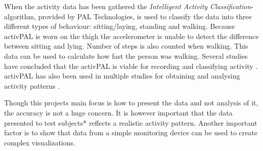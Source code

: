 When the activity data has been gathered the \emph{Intelligent Activity Classification}-algorithm, provided by PAL Technologies, is used to classify the data into three different types of behaviour: sitting/laying, standing and walking. Because activPAL is worn on the thigh the accelerometer is unable to detect the difference between sitting and lying. Number of steps is also counted when walking. This data can be used to calculate how fast the person was walking.
Several studies have concluded that the activPAL is viable for recording and classifying activity \cite{grant2006, ryan2006, grant2008, tsavourelou}.
activPAL has also been used in multiple studies for obtaining and analysing activity patterns \cite{grant2010, lord, ryan2010}.

Though this projects main focus is how to present the data and not analysis of it, the accuracy is not a huge concern. It is however important that the data presented to test subjects* reflects a realistic activity pattern. Another important factor is to show that data from a simple monitoring device can be used to create complex visualizations.
